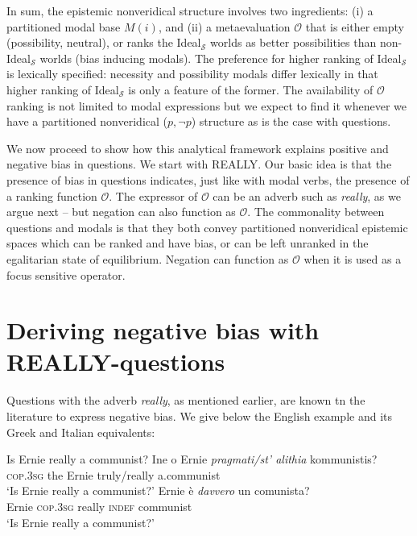 \documentclass[output=paper,colorlinks,citecolor=brown]{langscibook}
\begin{document}
In sum,  the epistemic nonveridical structure involves two ingredients: (i) a partitioned modal base $M(i)$, and (ii) a metaevaluation $\mathcal{O}$ that is either empty (possibility, neutral), or ranks the Ideal$_{\mathcal{S}}$ worlds as better possibilities than non-Ideal$_{\mathcal{S}}$ worlds (bias inducing modals). The preference for higher ranking of Ideal$_{\mathcal{S}}$ is lexically specified: necessity and possibility modals differ lexically in that higher ranking of Ideal$_{\mathcal{S}}$ is only a feature of the former. The availability of $\mathcal{O}$ ranking is not limited to modal expressions but we expect to find it whenever we have a partitioned nonveridical ($p, \neg p$) structure as is the case with questions.
 
We now proceed to show how this analytical framework explains positive and negative bias in questions. We start with \textsc{REALLY}. Our basic idea is that the presence of bias in questions indicates, just like with modal verbs, the presence of a ranking function $\mathcal{O}$. The expressor of $\mathcal{O}$ can be an adverb such as \textit{really}, as we argue next --  but negation can also function as $\mathcal{O}$. The commonality between questions and modals is that they both convey partitioned nonveridical epistemic spaces  which can be ranked and have bias, or can be left unranked in the egalitarian state of equilibrium. Negation can function as $\mathcal{O}$ when it is used as a focus sensitive operator.

    
\section{Deriving negative bias with \textsc{REALLY}-questions} \label{sec:02:3}
    
    
 Questions with the adverb \textit{really}, as mentioned earlier, are known tn the literature to express negative bias. We give below the English example and its Greek and Italian equivalents:

\ea Is Ernie really a communist? 
\ex \gll Ine o Ernie \textit{pragmati/st' alithia} kommunistis? \\
\textsc{cop.3sg} the Ernie truly/really a.communist\\
\glt `Is Ernie really a communist?'
\ex \gll Ernie \`e \textit{davvero} un comunista? \\
Ernie \textsc{cop.3sg} really \textsc{indef} communist \\
\glt `Is Ernie really a communist?'
\z
\end{document}
